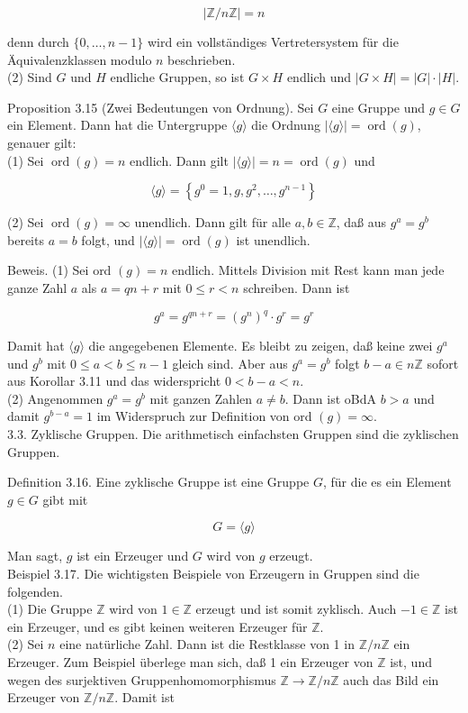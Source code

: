 \documentclass[10pt, letterpaper]{article}
\begin{document}
$$
|\mathbb{Z} / n \mathbb{Z}|=n
$$

denn durch $\{0, \ldots, n-1\}$ wird ein vollständiges Vertretersystem für die Äquivalenzklassen modulo $n$ beschrieben.\\
(2) Sind $G$ und $H$ endliche Gruppen, so ist $G \times H$ endlich und $|G \times H|=|G| \cdot|H|$.

Proposition 3.15 (Zwei Bedeutungen von Ordnung). Sei $G$ eine Gruppe und $g \in G$ ein Element. Dann hat die Untergruppe $\langle g\rangle$ die Ordnung $|\langle g\rangle|=\operatorname{ord}(g)$, genauer gilt:\\
(1) Sei $\operatorname{ord}(g)=n$ endlich. Dann gilt $|\langle g\rangle|=n=\operatorname{ord}(g)$ und

$$
\langle g\rangle=\left\{g^{0}=1, g, g^{2}, \ldots, g^{n-1}\right\}
$$

(2) Sei $\operatorname{ord}(g)=\infty$ unendlich. Dann gilt für alle $a, b \in \mathbb{Z}$, daß aus $g^{a}=g^{b}$ bereits $a=b$ folgt, und $|\langle g\rangle|=\operatorname{ord}(g)$ ist unendlich.

Beweis. (1) Sei ord $(g)=n$ endlich. Mittels Division mit Rest kann man jede ganze Zahl $a$ als $a=q n+r$ mit $0 \leq r<n$ schreiben. Dann ist

$$
g^{a}=g^{q n+r}=\left(g^{n}\right)^{q} \cdot g^{r}=g^{r}
$$

Damit hat $\langle g\rangle$ die angegebenen Elemente. Es bleibt zu zeigen, daß keine zwei $g^{a}$ und $g^{b}$ mit $0 \leq a<b \leq n-1$ gleich sind. Aber aus $g^{a}=g^{b}$ folgt $b-a \in n \mathbb{Z}$ sofort aus Korollar 3.11 und das widerspricht $0<b-a<n$.\\
(2) Angenommen $g^{a}=g^{b}$ mit ganzen Zahlen $a \neq b$. Dann ist oBdA $b>a$ und damit $g^{b-a}=1$ im Widerspruch zur Definition von ord $(g)=\infty$.\\
3.3. Zyklische Gruppen. Die arithmetisch einfachsten Gruppen sind die zyklischen Gruppen.

Definition 3.16. Eine zyklische Gruppe ist eine Gruppe $G$, für die es ein Element $g \in G$ gibt mit

$$
G=\langle g\rangle
$$

Man sagt, $g$ ist ein Erzeuger und $G$ wird von $g$ erzeugt.\\
Beispiel 3.17. Die wichtigsten Beispiele von Erzeugern in Gruppen sind die folgenden.\\
(1) Die Gruppe $\mathbb{Z}$ wird von $1 \in \mathbb{Z}$ erzeugt und ist somit zyklisch. Auch $-1 \in \mathbb{Z}$ ist ein Erzeuger, und es gibt keinen weiteren Erzeuger für $\mathbb{Z}$.\\
(2) Sei $n$ eine natürliche Zahl. Dann ist die Restklasse von 1 in $\mathbb{Z} / n \mathbb{Z}$ ein Erzeuger. Zum Beispiel überlege man sich, daß 1 ein Erzeuger von $\mathbb{Z}$ ist, und wegen des surjektiven Gruppenhomomorphismus $\mathbb{Z} \rightarrow \mathbb{Z} / n \mathbb{Z}$ auch das Bild ein Erzeuger von $\mathbb{Z} / n \mathbb{Z}$. Damit ist
\end{document}
